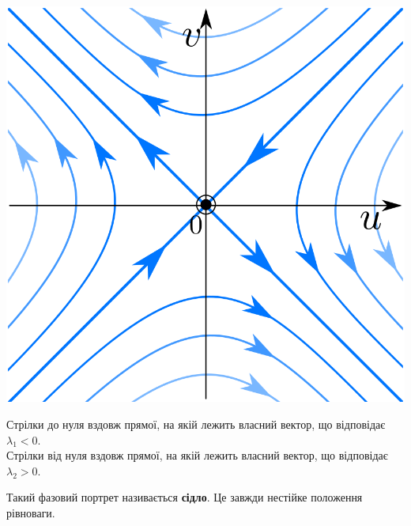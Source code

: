 \begin{center} \includegraphics[scale=0.25]{assets/lectures_recent-0ebe704d.png} \end{center}

\begin{remark}
    Стрілки до нуля вздовж прямої, на якій лежить власний вектор, що відповідає $ \lambda_1 < 0$.\\
    Стрілки від нуля вздовж прямої, на якій лежить власний вектор, що відповідає $ \lambda_2 > 0$.
\end{remark}
Такий фазовий портрет називається \textbf{сідло}. Це завжди нестійке положення рівноваги.

